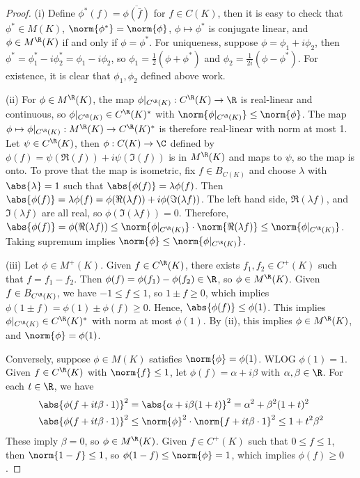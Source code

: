 \documentclass[a4paper]{article}
\begin{document}
\begin{proof}
  (i) Define $\phi^*(f)=\overline{\phi(\bar{f})}$ for $f\in C(K)$, then it is easy to check that $\phi^*\in M(K)$, $\norm{\phi^*}=\norm{\phi}$, $\phi\mapsto\phi^*$ is conjugate linear, and $\phi\in M^\R(K)$ if and only if $\phi=\phi^*$. For uniqueness, suppose $\phi=\phi_1+i\phi_2$, then $\phi^*=\phi_1^*-i\phi_2^*=\phi_1-i\phi_2$, so $\phi_1=\frac{1}{2}(\phi+\phi^*)$ and $\phi_2=\frac{1}{2i}(\phi-\phi^*)$. For existence, it is clear that $\phi_1,\phi_2$ defined above work.
  \vspace{\topsep}

  (ii) For $\phi\in M^\R(K)$, the map $\phi|_{C^\R(K)}:C^\R(K)\to\R$ is real-linear and continuous, so $\phi|_{C^\R(K)}\in C^\R(K)^*$ with $\norm{\phi|_{C^\R(K)}}\leq\norm{\phi}$. The map $\phi\mapsto\phi|_{C^\R(K)}: M^\R(K)\to C^\R(K)^*$ is therefore real-linear with norm at most 1. Let $\psi\in C^\R(K)$, then $\phi:C(K)\to\C$ defined by $\phi(f)=\psi(\Re(f))+i\psi(\Im(f))$ is in $M^\R(K)$ and maps to $\psi$, so the map is onto. To prove that the map is isometric, fix $f\in B_{C(K)}$ and choose $\lambda$ with $\abs{\lambda}=1$ such that $\abs{\phi(f)}=\lambda\phi(f)$. Then $\abs{\phi(f)}=\lambda\phi(f)=\phi(\Re(\lambda f))+i\phi(\Im(\lambda f))$. The left hand side, $\Re(\lambda f)$, and $\Im(\lambda f)$ are all real, so $\phi(\Im(\lambda f))=0$. Therefore, $\abs{\phi(f)}=\phi(\Re(\lambda f))\leq\norm{\phi|_{C^\R(K)}}\cdot\norm{\Re(\lambda f)}\leq\norm{\phi|_{C^\R(K)}}$. Taking supremum implies $\norm{\phi}\leq\norm{\phi|_{C^\R(K)}}$.
  \vspace{\topsep}

  (iii) Let $\phi\in M^+(K)$. Given $f\in C^\R(K)$, there exists $f_1,f_2\in C^+(K)$ such that $f=f_1-f_2$. Then $\phi(f)=\phi(f_1)-\phi(f_2)\in\R$, so $\phi\in M^\R(K)$. Given $f\in B_{C^\R(K)}$, we have $-1\leq f\leq 1$, so $1\pm f\geq 0$, which implies $\phi(1\pm f)=\phi(1)\pm\phi(f)\geq 0$. Hence, $\abs{\phi(f)}\leq\phi(1)$. This implies $\phi|_{C^\R(K)}\in C^\R(K)^*$ with norm at most $\phi(1)$. By (ii), this implies $\phi\in M^\R(K)$, and $\norm{\phi}=\phi(1)$.

  Conversely, suppose $\phi\in M(K)$ satisfies $\norm{\phi}=\phi(1)$. WLOG $\phi(1)=1$. Given $f\in C^\R(K)$ with $\norm{f}\leq 1$, let $\phi(f)=\alpha+i\beta$ with $\alpha,\beta\in\R$. For each $t\in\R$, we have
	\begin{align*}
		& \abs{\phi(f+it\beta\cdot 1)}^2=\abs{\alpha+i\beta(1+t)}^2=\alpha^2+\beta^2(1+t)^2\\
		& \abs{\phi(f+it\beta\cdot 1)}^2\leq\norm{\phi}^2\cdot\norm{f+it\beta\cdot 1}^2\leq 1+t^2\beta^2
	\end{align*}
  These imply $\beta=0$, so $\phi\in M^\R(K)$. Given $f\in C^+(K)$ such that $0\leq f\leq 1$, then $\norm{1-f}\leq 1$, so $\phi(1-f)\leq\norm{\phi}=1$, which implies $\phi(f)\geq 0$.
  \vspace{\topsep}


\end{proof}
\end{document}
